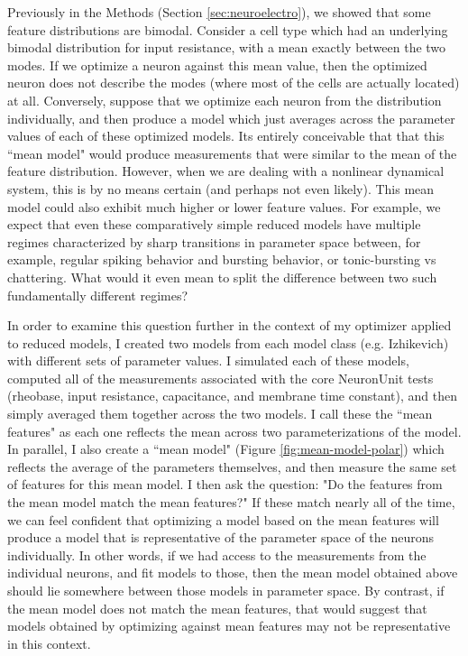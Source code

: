 Previously in the Methods (Section \ref{sec:neuroelectro}), we showed that some feature distributions are bimodal.
Consider a cell type which had an underlying bimodal distribution for input resistance, with a mean exactly between the two modes.
If we optimize a neuron against this mean value, then the optimized neuron does not describe the modes (where most of the cells are actually located) at all.
Conversely, suppose that we optimize each neuron from the distribution individually, and then produce a model which just averages across the parameter values of each of these optimized models.
Its entirely conceivable that that this ``mean model" would produce measurements that were similar to the mean of the feature distribution.
However, when we are dealing with a nonlinear dynamical system, this is by no means certain (and perhaps not even likely).
This mean model could also exhibit much higher or lower feature values.
For example, we expect that even these comparatively simple reduced models have multiple regimes characterized by sharp transitions in parameter space between, for example, regular spiking behavior and bursting behavior, or tonic-bursting vs chattering.
What would it even mean to split the difference between two such fundamentally different regimes?

In order to examine this question further in the context of my optimizer applied to reduced models, I created two models from each model class (e.g. Izhikevich) with different sets of parameter values.
I simulated each of these models, computed all of the measurements associated with the core NeuronUnit tests (rheobase, input resistance, capacitance, and membrane time constant), and then simply averaged them together across the two models.
I call these the ``mean features" as each one reflects the mean across two parameterizations of the model.
In parallel, I also create a ``mean model" (Figure \ref{fig:mean-model-polar}) which reflects the average of the parameters themselves, and then measure the same set of features for this mean model.
I then ask the question: "Do the features from the mean model match the mean features?"
If these match nearly all of the time, we can feel confident that optimizing a model based on the mean features will produce a model that is representative of the parameter space of the neurons individually.
In other words, if we had access to the measurements from the individual neurons, and fit models to those, then the mean model obtained above should lie somewhere between those models in parameter space.
By contrast, if the mean model does not match the mean features, that would suggest that models obtained by optimizing against mean features may not be representative in this context.

